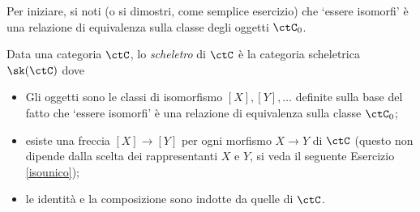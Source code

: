 Per iniziare, si noti (o si dimostri, come semplice esercizio) che `essere isomorfi' è una relazione di equivalenza sulla classe degli oggetti \(\ctC_0\).
\begin{definition}\label{def_scheletro}
	Data una categoria \(\ctC\), lo \emph{scheletro} di \(\ctC\) è la categoria scheletrica \(\sk(\ctC)\) dove
	\begin{itemize}
		\item Gli oggetti sono le classi di isomorfismo \([X],[Y],\dots\) definite sulla base del fatto che `essere isomorfi' è una relazione di equivalenza sulla classe \(\ctC_0\);
		\item esiste una freccia \([X]\to[Y]\) per ogni morfismo \(X\to Y\) di \(\ctC\) (questo non dipende dalla scelta dei rappresentanti \(X\) e \(Y\), si veda il seguente Esercizio \ref{isounico});
		\item le identità e la composizione sono indotte da quelle di \(\ctC\).
	\end{itemize}
\end{definition}
